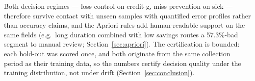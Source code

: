 Both decision regimes --- loss control on credit-g, miss prevention on sick --- therefore survive contact with unseen samples with quantified error profiles rather than accuracy claims, and the Apriori rules add human-readable support on the same fields (e.g.\ long duration combined with low savings routes a 57.3\%-bad segment to manual review; Section~\ref{sec:apriori}). The certification is bounded: each hold-out was scored once, and both originate from the same collection period as their training data, so the numbers certify decision quality under the training distribution, not under drift (Section~\ref{sec:conclusion}).

